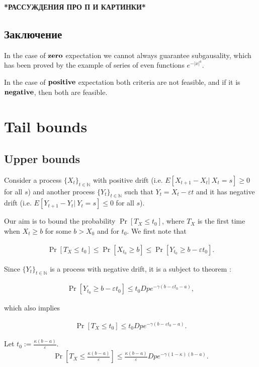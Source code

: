 \documentclass[12pt, a4paper]{article}
\theoremstyle{remark}
\newcommand{\expx}[1]{e^{-|x|^{#1}}}
\begin{document}
\textbf{*РАССУЖДЕНИЯ ПРО П И КАРТИНКИ*}


\subsection*{Заключение}

In the case of $\textbf{\text{zero}}$ expectation we cannot always guarantee subgausality, which has been proved by the example of series of even functions $\expx{a}$.

In the case of $\textbf{\text{positive}}$ expectation both criteria are not feasible, and if it is $\textbf{\text{negative}}$, then both are feasible.

\section{Tail bounds}
\subsection{Upper bounds}
Consider a process $\{X_t\}_{t \in \mathbb{N}}$ with positive drift (i.e. $E[X_{t + 1} - X_t |\ X_t = s] \geq 0$ for all $s$) and another process $\{Y_t\}_{t \in \mathbb{N}}$ such that $Y_t = X_t - \varepsilon t$ and it has negative drift (i.e. $E[Y_{t + 1} - Y_t |\ Y_t = s] \leq 0$ for all $s$).

Our aim is to bound the probability $\Pr[T_X \leq t_0]$, where $T_X$ is the first time when $X_t \geq b$ for some $b > X_0$ and for $t_0$. We first note that 

\begin{align*}
    \Pr[T_X \leq t_0] \leq \Pr[X_{t_0} \geq b] \leq \Pr[Y_{t_0} \geq b - \varepsilon t_0].
\end{align*}

Since $\{Y_t\}_{t \in \mathbb{N}}$ is a process with negative drift, it is a subject to theorem \cite{}:

\begin{align*}
    \Pr[Y_{t_0} \geq b - \varepsilon t_0] \leq t_0 D p e^{-\gamma(b - \varepsilon t_0 - a)},
\end{align*}

which also implies

\begin{align*}
    \Pr[T_X \leq t_0] \leq t_0 D p e^{-\gamma(b - \varepsilon t_0 - a)}.
\end{align*}

Let $t_0 := \frac{\kappa (b - a)}{\varepsilon}$. 
\begin{align*}
    \Pr\left[T_X \leq \frac{\kappa (b - a)}{\varepsilon}\right] \leq \frac{\kappa (b - a)}{\varepsilon} D p e^{-\gamma(1 - \kappa)(b - a)}.
\end{align*}
\end{document}
